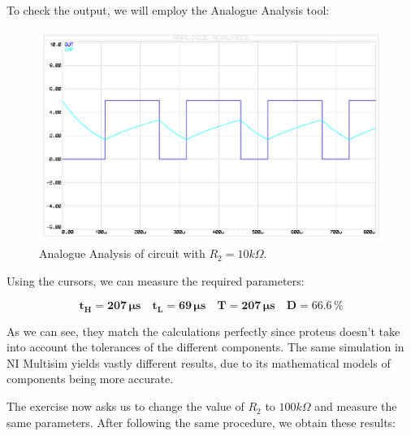 \clearpage

To check the output, we will employ the Analogue Analysis tool:

\begin{figure}[H]
    \centering
    \includegraphics[scale = 0.75]{Graphics/VHDL/Practice 2/GRAPHICS/555/GRAPHS/PROTEUS/ANALOGUE/555_ASTABLE_ANALOGUE_10K.PDF}
    \caption{Analogue Analysis of circuit with $R_2 = 10k \Omega$.}
    \label{fig:555_ASTABLE_ANALOGUE_10K}
\end{figure}


Using the cursors, we can measure the required parameters:

\begin{equation*}
    \mathbf{t_H} = \mathbf{207 \, \si\micro \text{s}} \quad
    \mathbf{t_L} = \mathbf{69 \, \si\micro \text{s}} \quad
    \mathbf{T} = \mathbf{207 \, \si\micro \text{s}} \quad
    \mathbf{D} =  \mathbf{66.6 \, \text{\%}}
\end{equation*}\medskip

As we can see, they match the calculations perfectly since proteus doesn't take into account the tolerances of the different components. The same simulation in NI Multisim yields vastly different results, due to its mathematical models of components being more accurate.\medskip

\clearpage

The exercise now asks us to change the value of $R_2$ to $100k\Omega$ and measure the same parameters. After following the same procedure, we obtain these results:

